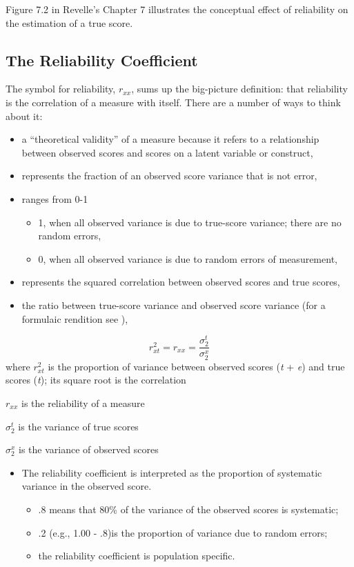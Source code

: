 \documentclass[
  english,
]{book}
\providecommand{\tightlist}{%
  \setlength{\itemsep}{0pt}\setlength{\parskip}{0pt}}
\begin{document}
Figure 7.2 in Revelle's Chapter 7 \citeyearpar{revelle_introduction_nodate} illustrates the conceptual effect of reliability on the estimation of a true score.

\hypertarget{the-reliability-coefficient}{%
\subsection{The Reliability Coefficient}\label{the-reliability-coefficient}}

The symbol for reliability, \(r_{xx}\), sums up the big-picture definition: that reliability is the correlation of a measure with itself. There are a number of ways to think about it:

\begin{itemize}
\tightlist
\item
  a ``theoretical validity'' of a measure because it refers to a relationship between observed scores and scores on a latent variable or construct,
\item
  represents the fraction of an observed score variance that is not error,
\item
  ranges from 0-1

  \begin{itemize}
  \tightlist
  \item
    1, when all observed variance is due to true-score variance; there are no random errors,
  \item
    0, when all observed variance is due to random errors of measurement,
  \end{itemize}
\item
  represents the squared correlation between observed scores and true scores,
\item
  the ratio between true-score variance and observed score variance (for a formulaic rendition see \citep{pedhazur_measurement_1991}),
\end{itemize}

\[r_{xt}^{2}=r_{xx} =\frac{\sigma_{2}^{t}}{\sigma_{2}^{x}}\]
where
\(r_{xt}^{2}\) is the proportion of variance between observed scores (\emph{t} + \emph{e}) and true scores (\emph{t}); its square root is the correlation

\(r_{xx}\) is the reliability of a measure

\({\sigma_{2}^{t}}\) is the variance of true scores

\({\sigma_{2}^{x}}\) is the variance of observed scores

\begin{itemize}
\tightlist
\item
  The reliability coefficient is interpreted as the proportion of systematic variance in the observed score.

  \begin{itemize}
  \tightlist
  \item
    .8 means that 80\% of the variance of the observed scores is systematic;
  \item
    .2 (e.g., 1.00 - .8)is the proportion of variance due to random errors;
  \item
    the reliability coefficient is population specific.
  \end{itemize}
\end{itemize}
\end{document}
